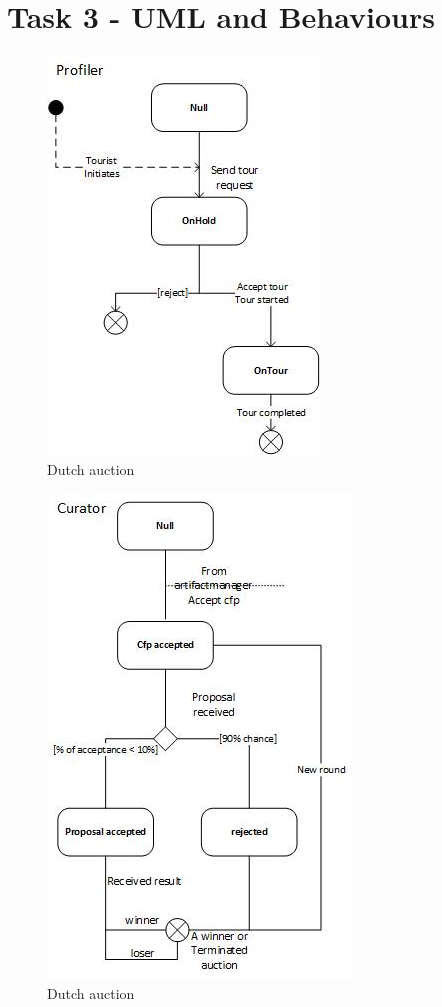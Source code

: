 \documentclass[a4paper, 11pt]{article}
\begin{document}
\section{Task 3 - UML and Behaviours}
\begin{figure}[H]
	\caption{Dutch auction}
	\centering
	\includegraphics[scale=0.9]{./images/profilerUML.jpg}
\end{figure}
\begin{figure}[H]
	\caption{Dutch auction}
	\centering
	\includegraphics[scale=0.9]{./images/curatorUML.jpg}
\end{figure}
\end{document}
